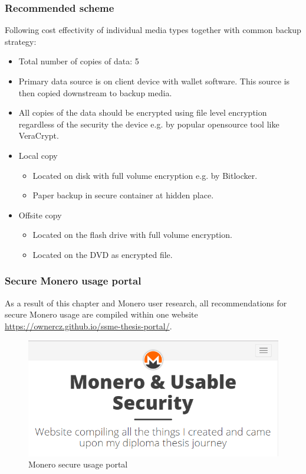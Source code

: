 \documentclass[
  printed, %
  table,   %
  nolof,     %
  nolot,     %
           oneside, color
]{fithesis3}
\begin{document}
\subsubsection{Recommended scheme}
Following cost effectivity of individual media types together with common backup strategy:
\begin{itemize}
\itemsep0em
\item Total number of copies of data: 5
\item Primary data source is on client device with wallet software. This source is then copied downstream to backup media.
\item All copies of the data should be encrypted using file level encryption regardless of the security the device e.g. by popular opensource tool like VeraCrypt.
\item Local copy
\begin{itemize}
\itemsep0em
\item Located on disk with full volume encryption e.g. by Bitlocker.
\item Paper backup in secure container at hidden place.
\end{itemize}
\item Offsite copy
\begin{itemize}
\itemsep0em
\item Located on the flash drive with full volume encryption.
\item Located on the DVD as encrypted file.
\end{itemize}
\end{itemize}

\subsubsection{Secure Monero usage portal}
As a result of this chapter and Monero user research, all recommendations for secure Monero usage are compiled within one website \url{https://ownercz.github.io/ssme-thesis-portal/}. %


\begin{figure}[H]
\begin{center}

    
 \includegraphics[trim={0 0 5px 1px},clip,width=1\textwidth]{Screenshot_7.png}
    \caption{Monero secure usage portal}

    \label{pic:moneroweb}
\end{center}
    \end{figure}
    
\end{document}
